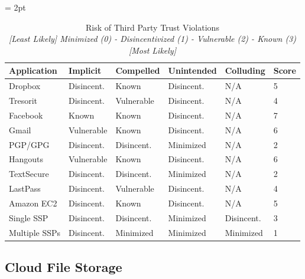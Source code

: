\begin{table}[!hb]
  \footnotesize
  \centering
  \tabulinesep = 2pt
  \begin{tabu} to \textwidth
    { | X[1,c,m]
      | X[1,c,m]
      | X[1,c,m]
      | X[1,c,m]
      | X[1,c,m]
      | X[0.5,c,m]
      | }
    \hline
    \textbf{Application}
    & \textbf{Implicit}
    & \textbf{Compelled}
    & \textbf{Unintended}
    & \textbf{Colluding}
    & \textbf{Score}
    \\ \hline
    Dropbox
    & Disincent.
    & Known
    & Disincent.
    & N/A
    & 5
    \\ \hline
    Tresorit
    & Disincent.
    & Vulnerable
    & Disincent.
    & N/A
    & 4
    \\ \hline
    Facebook
    & Known
    & Known
    & Disincent.
    & N/A
    & 7
    \\ \hline
    Gmail
    & Vulnerable
    & Known
    & Disincent.
    & N/A
    & 6
    \\ \hline
    PGP/GPG
    & Disincent.
    & Disincent.
    & Minimized
    & N/A
    & 2
    \\ \hline
    Hangouts
    & Vulnerable
    & Known
    & Disincent.
    & N/A
    & 6
    \\ \hline
    TextSecure
    & Disincent.
    & Disincent.
    & Minimized
    & N/A
    & 2
    \\ \hline
    LastPass
    & Disincent.
    & Vulnerable
    & Disincent.
    & N/A
    & 4
    \\ \hline
    Amazon EC2
    & Disincent.
    & Known
    & Disincent.
    & N/A
    & 5
    \\ \hline
    Single SSP
    & Disincent.
    & Disincent.
    & Minimized
    & Disincent.
    & 3
    \\ \hline
    Multiple SSPs
    & Disincent.
    & Minimized
    & Minimized
    & Minimized
    & 1
    \\ \hline
  \end{tabu}
  \caption[Risk of Third Party Trust Violations]{
    Risk of Third Party Trust Violations\\
    \textit{[Least Likely] Minimized (0) - Disincentivized (1) -
      Vulnerable (2) - Known (3) [Most Likely]}
  }
  \label{tab:trust:app:threats}
\end{table}

\subsection{Cloud File Storage}

